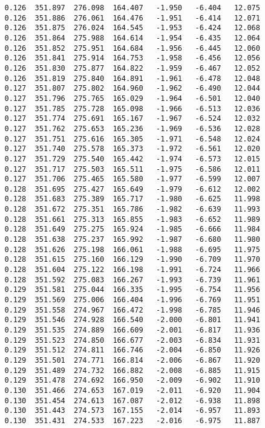 \begin{verbatim}
   0.126  351.897  276.098  164.407   -1.950   -6.404   12.075
   0.126  351.886  276.061  164.476   -1.951   -6.414   12.071
   0.126  351.875  276.024  164.545   -1.953   -6.424   12.068
   0.126  351.864  275.988  164.614   -1.954   -6.435   12.064
   0.126  351.852  275.951  164.684   -1.956   -6.445   12.060
   0.126  351.841  275.914  164.753   -1.958   -6.456   12.056
   0.126  351.830  275.877  164.822   -1.959   -6.467   12.052
   0.126  351.819  275.840  164.891   -1.961   -6.478   12.048
   0.127  351.807  275.802  164.960   -1.962   -6.490   12.044
   0.127  351.796  275.765  165.029   -1.964   -6.501   12.040
   0.127  351.785  275.728  165.098   -1.966   -6.513   12.036
   0.127  351.774  275.691  165.167   -1.967   -6.524   12.032
   0.127  351.762  275.653  165.236   -1.969   -6.536   12.028
   0.127  351.751  275.616  165.305   -1.971   -6.548   12.024
   0.127  351.740  275.578  165.373   -1.972   -6.561   12.020
   0.127  351.729  275.540  165.442   -1.974   -6.573   12.015
   0.127  351.717  275.503  165.511   -1.975   -6.586   12.011
   0.127  351.706  275.465  165.580   -1.977   -6.599   12.007
   0.128  351.695  275.427  165.649   -1.979   -6.612   12.002
   0.128  351.683  275.389  165.717   -1.980   -6.625   11.998
   0.128  351.672  275.351  165.786   -1.982   -6.639   11.993
   0.128  351.661  275.313  165.855   -1.983   -6.652   11.989
   0.128  351.649  275.275  165.924   -1.985   -6.666   11.984
   0.128  351.638  275.237  165.992   -1.987   -6.680   11.980
   0.128  351.626  275.198  166.061   -1.988   -6.695   11.975
   0.128  351.615  275.160  166.129   -1.990   -6.709   11.970
   0.128  351.604  275.122  166.198   -1.991   -6.724   11.966
   0.128  351.592  275.083  166.267   -1.993   -6.739   11.961
   0.129  351.581  275.044  166.335   -1.995   -6.754   11.956
   0.129  351.569  275.006  166.404   -1.996   -6.769   11.951
   0.129  351.558  274.967  166.472   -1.998   -6.785   11.946
   0.129  351.546  274.928  166.540   -2.000   -6.801   11.941
   0.129  351.535  274.889  166.609   -2.001   -6.817   11.936
   0.129  351.523  274.850  166.677   -2.003   -6.834   11.931
   0.129  351.512  274.811  166.746   -2.004   -6.850   11.926
   0.129  351.501  274.771  166.814   -2.006   -6.867   11.920
   0.129  351.489  274.732  166.882   -2.008   -6.885   11.915
   0.129  351.478  274.692  166.950   -2.009   -6.902   11.910
   0.130  351.466  274.653  167.019   -2.011   -6.920   11.904
   0.130  351.454  274.613  167.087   -2.012   -6.938   11.898
   0.130  351.443  274.573  167.155   -2.014   -6.957   11.893
   0.130  351.431  274.533  167.223   -2.016   -6.975   11.887

\end{verbatim}
